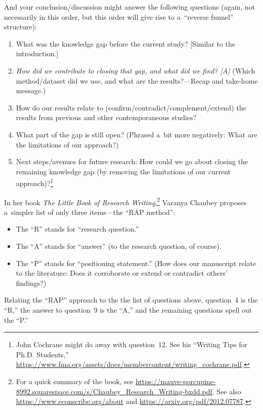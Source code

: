 \documentclass[12pt, a4paper, oneside]{article}
\theoremstyle{Plain}
\theoremstyle{Definition}
\theoremstyle{Remark}
\begin{document}
And your conclusion/discussion might answer the following questions (again, not necessarily in this order, but this order will give rise to a~``reverse funnel'' structure):
\begin{enumerate}[resume, labelindent = \parindent, leftmargin = 2\parindent]
	\item What was the knowledge gap before the current study? [Similar to the introduction.]
	\item \emph{How did we contribute to closing that gap, and what did we find? [A]} (Which method\slash dataset did we use, and what are the results?---Recap and take-home message.)
	\item How do our results relate to (confirm\slash contradict\slash complement\slash extend) the results from previous and other contemporaneous studies?
	\item What part of the gap is still open? (Phrased a~bit more negatively: What are the limitations of our approach?)
	\item Next steps\slash avenues for future research: How could we go about closing the remaining knowledge gap (by removing the limitations of our current approach)?\footnote{John Cochrane might do away with question~12. See his ``Writing Tips for Ph.D. Students,'' \url{https://www.fma.org/assets/docs/membercontent/writing_cochrane.pdf}.}
\end{enumerate}

In her book \textit{The Little Book of Research Writing},\footnote{For a quick summary of the book, see \url{https://mauve-porcupine-8992.squarespace.com/s/Chaubey_Research_Writing-bxdd.pdf}. See also \url{https://www.econscribe.org/about} and \url{https://arxiv.org/pdf/2012.07787}.} Varanya Chaubey proposes a~simpler list of only three items---the ``RAP method'':
\begin{itemize}
	\item The ``R'' stands for ``research question.''
	\item The ``A'' stands for ``answer'' (to the research question, of course).
	\item The ``P'' stands for ``positioning statement.'' (How does our manuscript relate to the literature: Does it corroborate or extend or contradict others' findings?)
\end{itemize}

Relating the ``RAP'' approach to the the list of questions above, question~4 is the ``R,'' the answer to question~9 is the ``A,'' and the remaining questions spell out the ``P.''
\end{document}
